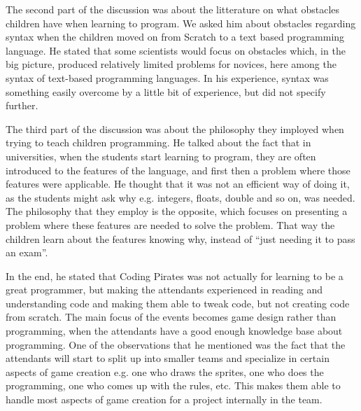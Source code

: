 The second part of the discussion was about the litterature on what obstacles children have when learning to program. We asked him about obstacles regarding syntax when the children moved on from Scratch to a text based programming language. He stated that some scientists would focus on obstacles which, in the big picture, produced relatively limited problems for novices, here among the syntax of text-based programming languages. In his experience, syntax was something easily overcome by a little bit of experience, but did not specify further.

The third part of the discussion was about the philosophy they imployed when trying to teach children programming. He talked about the fact that in universities, when the students start learning to program, they are often introduced to the features of the language, and first then a problem where those features were applicable. He thought that it was not an efficient way of doing it, as the students might ask why e.g. integers, floats, double and so on, was needed. The philosophy that they employ is the opposite, which focuses on presenting a problem where these features are needed to solve the problem. That way the children learn about the features knowing why, instead of ``just needing it to pass an exam''.

In the end, he stated that Coding Pirates was not actually for learning to be a great programmer, but making the attendants experienced in reading and understanding code and making them able to tweak code, but not creating code from scratch. The main focus of the events becomes game design rather than programming, when the attendants have a good enough knowledge base about programming. One of the observations that he mentioned was the fact that the attendants will start to split up into smaller teams and specialize in certain aspects of game creation e.g. one who draws the sprites, one who does the programming, one who comes up with the rules, etc. This makes them able to handle most aspects of game creation for a project internally in the team.